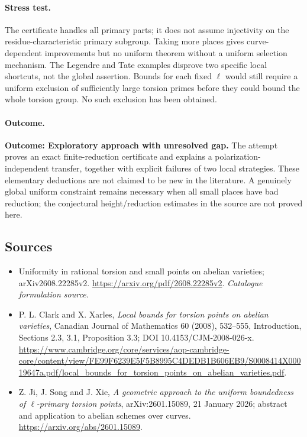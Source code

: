 \documentclass[11pt,a4paper]{article}
\numberwithin{equation}{section}
\begin{document}
\paragraph{Stress test.}
The certificate handles all primary parts; it does not assume injectivity
on the residue-characteristic primary subgroup. Taking more places gives
curve-dependent improvements but no uniform theorem without a uniform
selection mechanism. The Legendre and Tate examples disprove two specific
local shortcuts, not the global assertion. Bounds for each fixed $\ell$
would still require a uniform exclusion of sufficiently large torsion
primes before they could bound the whole torsion group. No such exclusion
has been obtained.

\paragraph{Outcome.}
\textbf{Outcome: Exploratory approach with unresolved gap.}
The attempt proves an exact finite-reduction certificate and explains a
polarization-independent transfer, together with explicit failures of two
local strategies. These elementary deductions are not claimed to be new
in the literature. A genuinely global uniform constraint remains necessary
when all small places have bad reduction; the conjectural height/reduction
estimates in the source are not proved here.

\subsection{Sources}
\begin{itemize}\raggedright
\item[\textnormal{[S1]}]\hypertarget{source:statement:1}{} Uniformity in rational torsion and small points on abelian varieties; arXiv2608.22285v2.
\url{https://arxiv.org/pdf/2608.22285v2}.
{\small\textit{Catalogue formulation source.}}
\item[\textnormal{[E1]}]\hypertarget{extra:statement:1}{} P. L. Clark and X. Xarles,
\emph{Local bounds for torsion points on abelian varieties}, Canadian Journal
of Mathematics 60 (2008), 532--555, Introduction, Sections 2.3, 3.1,
Proposition 3.3; DOI 10.4153/CJM-2008-026-x.
\url{https://www.cambridge.org/core/services/aop-cambridge-core/content/view/FE99F6239E5F5B8995C4DEDB1B606EB9/S0008414X00019647a.pdf/local_bounds_for_torsion_points_on_abelian_varieties.pdf}.
\item[\textnormal{[E2]}]\hypertarget{extra:statement:2}{} Z. Ji, J. Song and J. Xie,
\emph{A geometric approach to the uniform boundedness of $\ell$-primary
torsion points}, arXiv:2601.15089, 21 January 2026; abstract and application
to abelian schemes over curves. \url{https://arxiv.org/abs/2601.15089}.

\end{itemize}
\end{document}
